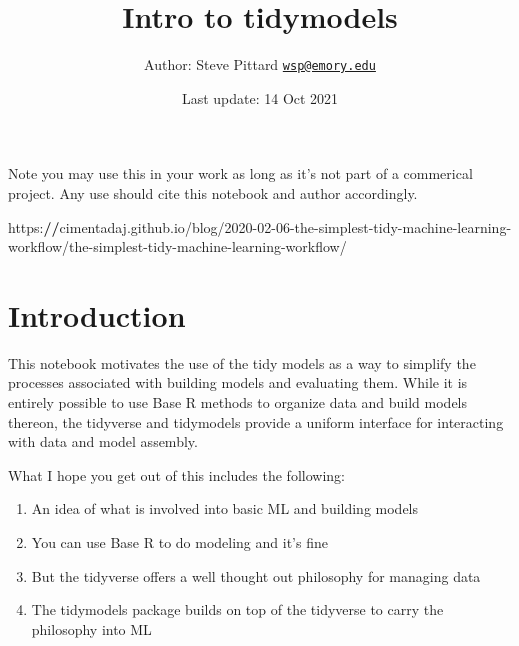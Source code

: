 \documentclass[
]{article}
\title{Intro to tidymodels}
\author{Author: Steve Pittard
\href{mailto:wsp@emory.edu}{\nolinkurl{wsp@emory.edu}}}
\date{Last update: 14 Oct 2021}
\newenvironment{Shaded}{\begin{snugshade}}{\end{snugshade}}
\newcommand{\DecValTok}[1]{\textcolor[rgb]{0.00,0.00,0.81}{#1}}
\newcommand{\ErrorTok}[1]{\textcolor[rgb]{0.64,0.00,0.00}{\textbf{#1}}}
\newcommand{\NormalTok}[1]{#1}
\newcommand{\SpecialCharTok}[1]{\textcolor[rgb]{0.00,0.00,0.00}{#1}}
\providecommand{\tightlist}{%
  \setlength{\itemsep}{0pt}\setlength{\parskip}{0pt}}
\begin{document}
\maketitle

Note you may use this in your work as long as it's not part of a
commerical project. Any use should cite this notebook and author
accordingly.

\begin{Shaded}
\begin{Highlighting}[]
\NormalTok{https}\SpecialCharTok{:}\ErrorTok{//}\NormalTok{cimentadaj.github.io}\SpecialCharTok{/}\NormalTok{blog}\SpecialCharTok{/}\DecValTok{2020{-}02{-}06}\SpecialCharTok{{-}}\NormalTok{the}\SpecialCharTok{{-}}\NormalTok{simplest}\SpecialCharTok{{-}}\NormalTok{tidy}\SpecialCharTok{{-}}\NormalTok{machine}\SpecialCharTok{{-}}\NormalTok{learning}\SpecialCharTok{{-}}\NormalTok{workflow}\SpecialCharTok{/}\NormalTok{the}\SpecialCharTok{{-}}\NormalTok{simplest}\SpecialCharTok{{-}}\NormalTok{tidy}\SpecialCharTok{{-}}\NormalTok{machine}\SpecialCharTok{{-}}\NormalTok{learning}\SpecialCharTok{{-}}\NormalTok{workflow}\SpecialCharTok{/}
\end{Highlighting}
\end{Shaded}

\hypertarget{introduction}{%
\section{Introduction}\label{introduction}}

This notebook motivates the use of the tidy models as a way to simplify
the processes associated with building models and evaluating them. While
it is entirely possible to use Base R methods to organize data and build
models thereon, the tidyverse and tidymodels provide a uniform interface
for interacting with data and model assembly.

What I hope you get out of this includes the following:

\begin{enumerate}
\def\labelenumi{\arabic{enumi})}
\tightlist
\item
  An idea of what is involved into basic ML and building models
\item
  You can use Base R to do modeling and it's fine
\item
  But the tidyverse offers a well thought out philosophy for managing
  data
\item
  The tidymodels package builds on top of the tidyverse to carry the
  philosophy into ML
\end{enumerate}
\end{document}
